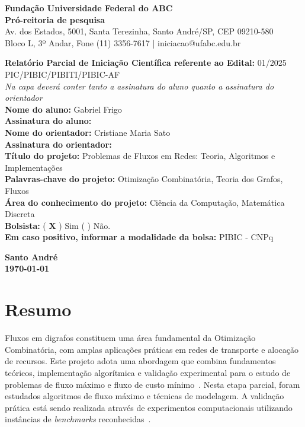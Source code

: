 \documentclass[12pt,a4paper]{article}
\begin{document}
\onehalfspacing

\begin{center}
    \textbf{Fundação Universidade Federal do ABC}\\
    \textbf{Pró-reitoria de pesquisa}\\
    \small Av. dos Estados, 5001, Santa Terezinha, Santo André/SP, CEP 09210-580\\
    Bloco L, 3º Andar, Fone (11) 3356-7617 | iniciacao@ufabc.edu.br
\end{center}

\vspace{0.8cm}

\noindent \textbf{Relatório Parcial de Iniciação Científica referente ao Edital:} 01/2025 PIC\slash PIBIC\slash PIBITI\slash PIBIC-AF \\[0.5cm]
\noindent \emph{Na capa deverá conter tanto a assinatura do aluno quanto a assinatura do orientador}\\[0.5cm]
\noindent \textbf{Nome do aluno:} Gabriel Frigo \\
\noindent \textbf{Assinatura do aluno:} \hrulefill \\[0.5cm]
\noindent \textbf{Nome do orientador:} Cristiane Maria Sato \\
\noindent \textbf{Assinatura do orientador:} \hrulefill \\[0.5cm]
\noindent \textbf{Título do projeto:} Problemas de Fluxos em Redes: Teoria, Algoritmos e Implementações \\[0.5cm]
\noindent \textbf{Palavras-chave do projeto:} Otimização Combinatória, Teoria dos Grafos, Fluxos \\[0.5cm]
\noindent \textbf{Área do conhecimento do projeto:} Ciência da Computação, Matemática Discreta \\[0.5cm]
\noindent \textbf{Bolsista:} ( \textbf{\textsf{X}} ) Sim \quad ( \quad ) Não. \\
\textbf{Em caso positivo, informar a modalidade da bolsa:} PIBIC - CNPq \\[1cm]

\begin{center}
    \textbf{Santo André}\\
    \textbf{\today}
\end{center}

\newpage
\renewcommand{\contentsname}{Sumário}
\tableofcontents
\newpage

\section{Resumo}
Fluxos em digrafos constituem uma área fundamental da Otimização Combinatória, com amplas aplicações práticas em redes de transporte e alocação de recursos. Este projeto adota uma abordagem que combina fundamentos teóricos, implementação algorítmica e validação experimental para o estudo de problemas de fluxo máximo e fluxo de custo mínimo~\cite{ahuja1993network}. Nesta etapa parcial, foram estudados algoritmos de fluxo máximo e técnicas de modelagem. A validação prática está sendo realizada através de experimentos computacionais utilizando instâncias de \textit{benchmarks} reconhecidas~\cite{Jensen2022}.
\end{document}
